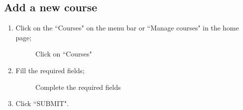 \documentclass[ManualeUtente]{subfiles}
\begin{document}
\subsection{Add a new course}
\begin{enumerate}
	\item Click on the \textquotedblleft Courses" on the menu bar or \textquotedblleft Manage courses" in the home page;
	\begin{figure}[H]
		\centering
		\caption{Click on ``Courses"}
		\label{fig:Click on "Courses"}
	\end{figure}
	\item Fill the required fields;
	\begin{figure}[H]
		\centering
		\caption{Complete the required fields}
		\label{fig:Complete the required fields}
	\end{figure}
	\item Click \textquotedblleft SUBMIT".

\end{enumerate}
\end{document}
